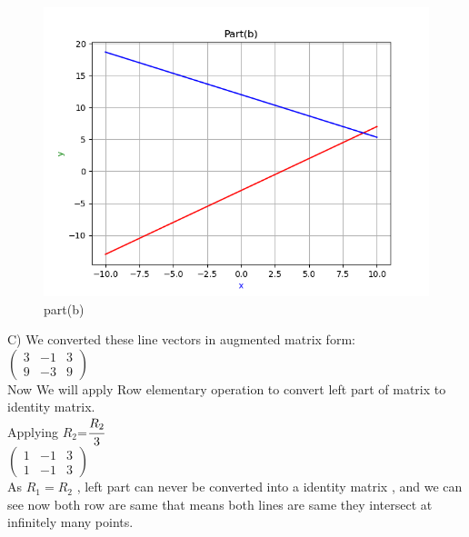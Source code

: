 \renewcommand{\thefigure}{\theenumi.\arabic{figure}}
\begin{figure}[!ht]
    \centering
    \includegraphics[width=\columnwidth]{./figures/A1_partb}
\caption{part(b)}
\label{fig: part(b)}
\end{figure}

C)
We converted these line vectors in augmented matrix form:\\ 

$\begin{pmatrix}
3 & -1 & 3\\
9 & -3 & 9
\end{pmatrix}$\\
 

Now We will apply Row elementary operation to convert left part of matrix to identity matrix.\\

Applying $R_{2}$=$\cfrac{R_{2}}{3}$\\

$\begin{pmatrix}
1 & -1 & 3\\
1 & -1 & 3
\end{pmatrix}$\\

As $R_{1}=R_{2}$ , left part can never be converted into a identity matrix , and we can see now both row are same that means both lines are same they intersect at infinitely many points.\\


